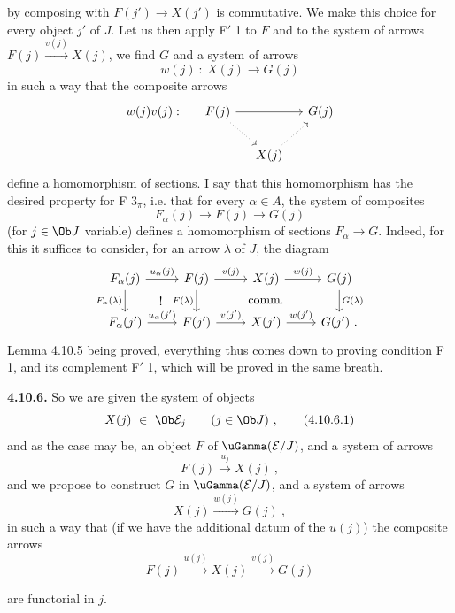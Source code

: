 by composing with $F(j')\longrightarrow X(j')$ is commutative. We make this choice for every object $j'$ of $J$. Let us then apply F$'$ 1 to $F$ and to the system of arrows $F(j)\xrightarrow{v(j)}X(j)$, we find $G$ and a system of arrows
\[
w(j)\ :\ X(j) \longrightarrow G(j)
\]
in such a way that the composite arrows
\[
\begin{tikzcd}[column sep=small]
w(j)v(j) : & F(j) \arrow[rr] \arrow[dr,dotted] & & G(j) \\
& & X(j) \arrow[ur,dotted] &
\end{tikzcd}
\]
define a homomorphism of sections. I say that this homomorphism has the desired property for F $3_\pi$, i.e. that for every $\alpha\in A$, the system of composites
\[
F_\alpha(j) \longrightarrow F(j) \longrightarrow G(j)
\]
(for $j\in\Ob J$ variable) defines a homomorphism of sections $F_\alpha\longrightarrow G$. Indeed, for this it suffices to consider, for an arrow $\lambda$ of $J$, the
diagram
\[
\begin{tikzcd}
F_\alpha(j) \arrow[r,"u_\alpha(j)"] \arrow[d,"F_\alpha(\lambda)"'] \arrow[dr,phantom,"!"] & F(j) \arrow[r,"v(j)"] \arrow[d,"F(\lambda)"'] & X(j) \arrow[r,"w(j)"] \arrow[d,phantom,"\text{comm.}"] & G(j) \arrow[d,"G(\lambda)"] \\
F_\alpha(j') \arrow[r,"u_\alpha(j')"] & F(j') \arrow[r,"v(j')"] & X(j') \arrow[r,"w(j')"] & G(j')\ .
\end{tikzcd}
\]
Lemma 4.10.5 being proved, everything thus comes down to proving condition F 1, and its complement F$'$ 1, which will be proved in the same breath.

\textbf{4.10.6.} So we are given the system of objects
\[
X(j)\ \in\ \Ob\mathcal{E}_j \qquad (j\in\Ob J)\ , \tag*{(4.10.6.1)}
\]
and as the case may be, an object $F$ of $\uGamma(\mathcal{E}/J)$, and a system of arrows
\[
F(j) \xrightarrow{u_j} X(j)\ , \tag*{(4.6.10.2)} %
\]
and we propose to construct $G$ in $\uGamma(\mathcal{E}/J)$, and a system of arrows
\[
X(j) \xrightarrow{w(j)} G(j)\ , \tag*{(4.10.6.3)}
\]
in such a way that (if we have the additional datum of the $u(j)$) the composite arrows
\[
F(j) \xrightarrow{u(j)} X(j) \xrightarrow{v(j)} G(j) %
\]

are functorial in $j$.

